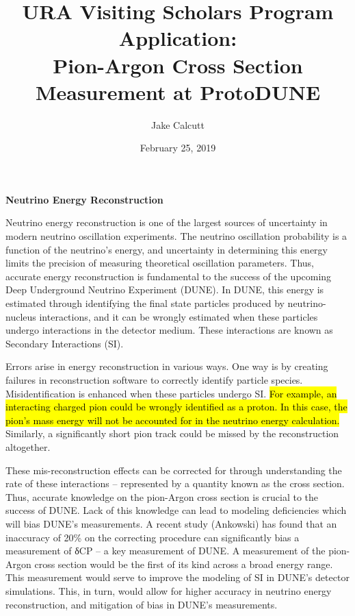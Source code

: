 \documentclass[12pt]{article}
\title{ \large \textbf{URA Visiting Scholars Program Application:} \\
\large Pion-Argon Cross Section Measurement at ProtoDUNE}
\date{February 25, 2019}
\begin{document}
\author{Jake Calcutt}

\maketitle
\thispagestyle{fancy}

\textbf{Neutrino Energy Reconstruction}

Neutrino energy reconstruction is one of the largest sources of uncertainty in modern neutrino
oscillation experiments. The neutrino oscillation probability is a function of the neutrino’s energy, and uncertainty in determining this energy limits the precision of measuring theoretical oscillation parameters. Thus, accurate energy reconstruction is fundamental to the success of the upcoming Deep Underground Neutrino Experiment (DUNE).  In DUNE, this energy is estimated through identifying the final state particles produced by neutrino-nucleus interactions, and it can be wrongly estimated when these particles undergo interactions in the detector medium. These interactions are known as Secondary Interactions (SI).
  
	Errors arise in energy reconstruction in various ways. One way is by creating failures in reconstruction software to correctly identify particle species.  Misidentification is enhanced when these particles undergo SI. \hl{For example, an interacting charged pion could be wrongly identified as a proton. In this case, the pion’s mass energy will not be accounted for in the neutrino energy calculation.} Similarly, a significantly short pion track could be missed by the reconstruction altogether. 
	
	These mis-reconstruction effects can be corrected for through understanding the rate of these interactions – represented by a quantity known as the cross section. Thus, accurate knowledge on the pion-Argon cross section is crucial to the success of DUNE. Lack of this knowledge can lead to modeling deficiencies which will bias DUNE’s measurements. A recent study (Ankowski) has found that an inaccuracy of 20\% on the correcting procedure can significantly bias a measurement of  δCP – a key measurement of DUNE. A measurement of the pion-Argon cross section would be the first of its kind across a broad energy range. This measurement would serve to improve the modeling of SI in DUNE’s detector simulations. This, in turn, would allow for higher accuracy in neutrino energy reconstruction, and mitigation of bias in DUNE’s measurements.
\\
\end{document}
